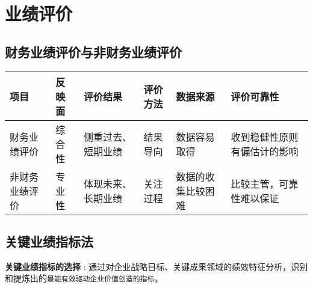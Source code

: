 \documentclass[11pt]{article}
\begin{document}
\section{业绩评价}
\label{sec:org6d77d2c}
\subsection{财务业绩评价与非财务业绩评价}
\label{sec:org54d2676}
\begin{center}
\begin{tabular}{llllll}
项目 & 反映面 & 评价结果 & 评价方法 & 数据来源 & 评价可靠性\\
\hline
财务业绩评价 & 综合性 & 侧重过去、短期业绩 & 结果导向 & 数据容易取得 & 收到稳健性原则有偏估计的影响\\
非财务业绩评价 & 专业性 & 体现未来、长期业绩 & 关注过程 & 数据的收集比较困难 & 比较主管，可靠性难以保证\\
\end{tabular}
\end{center}
\subsection{关键业绩指标法}
\label{sec:orgf96eec5}
\textbf{关键业绩指标的选择} : 通过对企业战略目标、关键成果领域的绩效特征分析，识别和提炼出的\texttt{最能有效驱动企业价值创造的指标}。
\end{document}
